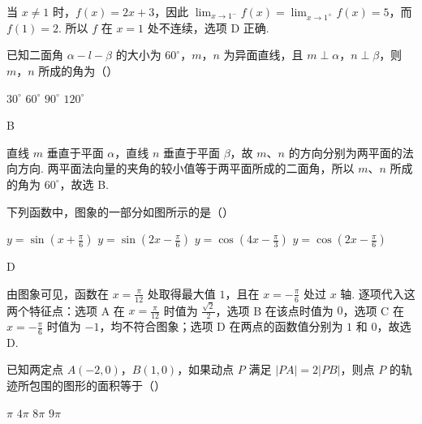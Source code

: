 \begin{solution}
当 \(x\ne 1\) 时，\(f(x)=2x+3\)，因此 \(\displaystyle\lim_{x\to1^-}f(x)=\displaystyle\lim_{x\to1^+}f(x)=5\)，而 \(f(1)=2\). 所以 \(f\) 在 \(x=1\) 处不连续，选项 D 正确.
\end{solution}

\begin{problem}
已知二面角 \(\alpha - l - \beta\) 的大小为 \(60^{\circ}\)，\(m\)，\(n\) 为异面直线，且 \(m \perp \alpha\)，\(n \perp \beta\)，则 \(m\)，\(n\) 所成的角为（\quad）

\choices
    {\(30^{\circ}\)}
    {\(60^{\circ}\)}
    {\(90^{\circ}\)}
    {\(120^{\circ}\)}
\end{problem}

\begin{answer}
B
\end{answer}

\begin{solution}
直线 \(m\) 垂直于平面 \(\alpha\)，直线 \(n\) 垂直于平面 \(\beta\)，故 \(m\)、\(n\) 的方向分别为两平面的法向方向. 两平面法向量的夹角的较小值等于两平面所成的二面角，所以 \(m\)、\(n\) 所成的角为 \(60^{\circ}\)，故选 B.
\end{solution}

\begin{problem}
下列函数中，图象的一部分如图所示的是（\quad）


\choices
    {\(y = \sin \left(x + \frac{\pi}{6}\right)\)}
    {\(y = \sin \left(2x - \frac{\pi}{6}\right)\)}
    {\(y = \cos \left(4x - \frac{\pi}{3}\right)\)}
    {\(y = \cos \left(2x - \frac{\pi}{6}\right)\)}
\end{problem}

\begin{answer}
D
\end{answer}

\begin{solution}
由图象可见，函数在 \(x=\frac{\pi}{12}\) 处取得最大值 \(1\)，且在 \(x=-\frac{\pi}{6}\) 处过 \(x\) 轴. 逐项代入这两个特征点：选项 A 在 \(x=\frac{\pi}{12}\) 时值为 \(\frac{\sqrt2}{2}\)，选项 B 在该点时值为 \(0\)，选项 C 在 \(x=-\frac{\pi}{6}\) 时值为 \(-1\)，均不符合图象；选项 D 在两点的函数值分别为 \(1\) 和 \(0\)，故选 D.
\end{solution}

\begin{problem}
已知两定点 \(A(-2,0)\)，\(B(1,0)\)，如果动点 \(P\) 满足 \(\lvert PA\rvert=2\lvert PB\rvert\)，则点 \(P\) 的轨迹所包围的图形的面积等于（\quad）

\choices
    {\(\pi\)}
    {\(4\pi\)}
    {\(8\pi\)}
    {\(9\pi\)}
\end{problem}

